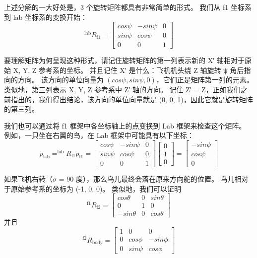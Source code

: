 上述分解的一大好处是，3 个旋转矩阵都具有非常简单的形式。
我们从 f1 坐标系到 lab 坐标系的变换开始：
\begin{equation}
	^\text{lab} R_\text{f1} = 
		\begin{bmatrix} %
			cos \psi & -sin \psi & 0 \\
			sin \psi & cos \psi  & 0 \\
			0 & 0 & 1
		\end{bmatrix}
	\label{eq:7_6}
\end{equation}


要理解矩阵为何呈现这种形式，请记住旋转矩阵的第一列表示新的 X′ 轴相对于原始 {X, Y, Z} 参考系的坐标。
并且记住 X′ 是什么：飞机机头绕 Z 轴旋转 ψ 角后指向的方向。
该方向的单位向量为 $(cos \psi, sin \psi, 0)$，它们正是矩阵第一列的元素。类似地，第三列表示 {X, Y, Z} 参考系中 Z′ 轴的方向。
记住 Z′ = Z，正如我们之前指出的，我们得出结论，该方向的单位向量就是 (0, 0, 1)，因此它就是旋转矩阵的第三列。


我们也可以通过将 f1 框架中各坐标轴上的点变换到 Lab 框架来检查这个矩阵。
例如，一只坐在右翼的鸟，在 Lab 框架中可能具有以下坐标：
%
\begin{equation}
	p_\text{lab}
	= ^\text{lab} R_\text{f1} p_\text{f1}
	= \begin{bmatrix}
		cos \psi & -sin \psi & 0 \\
		sin \psi & cos \psi & 0 \\
		0 & 0 & 1
	  \end{bmatrix}
	  \begin{bmatrix}
	  	0 \\
	  	1 \\
	  	0
	  \end{bmatrix}
	= \begin{bmatrix}
		-sin \psi \\
		cos \psi \\
		0
	\end{bmatrix}
	\label{eq:7_7}
\end{equation}


如果飞机右转（$\sigma$ = 90 度），那么鸟儿最终会落在原来方向舵的位置。
鸟儿相对于原始参考系的坐标为 (-1, 0, 0)。
类似地，我们可以证明
%
\begin{equation}
	^\text{f1} R_\text{f2} = 
		\begin{bmatrix}
			cos \theta & 0 & sin \theta \\
			0 & 1 & 0 \\
			-sin \theta & 0 & cos \theta
		\end{bmatrix}
	\label{eq:7_8}
\end{equation}
并且
\begin{equation}
	^\text{f2} R_\text{body}
		= \begin{bmatrix}
			1 & 0 & 0 \\
			0 & cos \phi & -sin \phi \\
			0 & sin \psi & cos \phi
		\end{bmatrix}
	\label{eq:7_9}
\end{equation}


